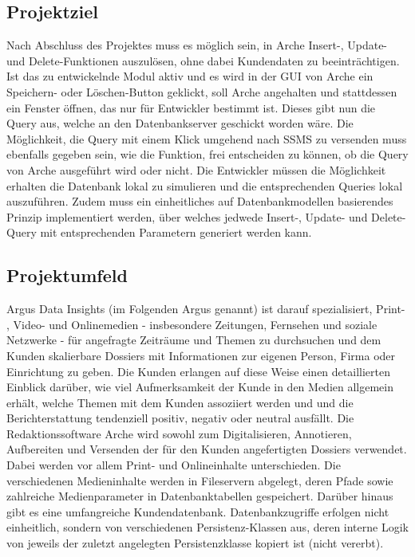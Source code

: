 \documentclass[11pt,toc=sectionentrywithoutdots, 
headheight=44pt, headings=optiontoheadandtoc, hyperfootnotes=false, hypertexnames=false]{scrartcl}
\begin{document}
\subsection{Projektziel}
Nach Abschluss des Projektes muss es möglich sein, in Arche Insert-, Update- und Delete-Funktionen auszulösen, ohne dabei Kundendaten zu beeinträchtigen. Ist das zu entwickelnde Modul aktiv und es wird in der GUI von Arche ein Speichern- oder Löschen-Button geklickt, soll Arche angehalten und stattdessen ein Fenster öffnen, das nur für Entwickler bestimmt ist. Dieses gibt nun die Query aus, welche an den Datenbankserver geschickt worden wäre. Die Möglichkeit, die Query mit einem Klick umgehend nach \acs{SSMS} zu versenden muss ebenfalls gegeben sein, wie die Funktion, frei entscheiden zu können, ob die Query von Arche ausgeführt wird oder nicht. Die Entwickler müssen die Möglichkeit erhalten die Datenbank lokal zu simulieren und die entsprechenden Queries lokal auszuführen. Zudem muss ein einheitliches auf Datenbankmodellen basierendes Prinzip implementiert werden, über welches jedwede Insert-, Update- und Delete-Query mit entsprechenden Parametern generiert werden kann.%

\subsection{Projektumfeld}
Argus Data Insights (im Folgenden \glqq Argus\grqq{} genannt) ist darauf spezialisiert, Print- , Video- und Onlinemedien - insbesondere Zeitungen, Fernsehen und soziale Netzwerke - für angefragte Zeiträume und Themen zu durchsuchen und dem Kunden skalierbare Dossiers mit Informationen zur eigenen Person, Firma oder Einrichtung zu geben. Die Kunden erlangen auf diese Weise einen detaillierten Einblick darüber, wie viel Aufmerksamkeit der Kunde in den Medien allgemein erhält, welche Themen mit dem Kunden assoziiert werden und und die Berichterstattung tendenziell positiv, negativ oder neutral ausfällt. Die Redaktionssoftware Arche wird sowohl zum Digitalisieren, Annotieren, Aufbereiten und Versenden der für den Kunden angefertigten Dossiers verwendet. Dabei werden vor allem Print- und Onlineinhalte unterschieden. Die verschiedenen Medieninhalte werden in Fileservern abgelegt, deren Pfade sowie zahlreiche Medienparameter in Datenbanktabellen gespeichert. Darüber hinaus gibt es eine umfangreiche Kundendatenbank. Datenbankzugriffe erfolgen nicht einheitlich, sondern von verschiedenen \gls{Persistenz}-Klassen aus, deren interne Logik von jeweils der zuletzt angelegten Persistenzklasse kopiert ist (nicht vererbt).
\end{document}
